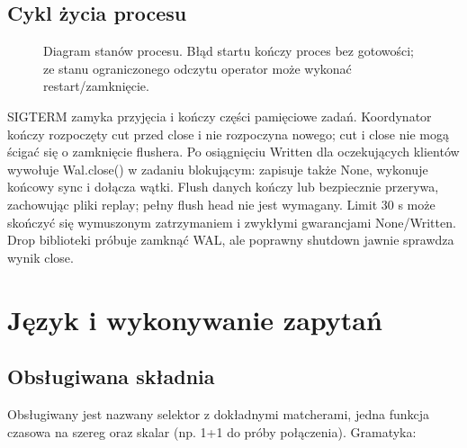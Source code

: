 \documentclass[11pt,a4paper]{article}
\begin{document}
\subsection{Cykl życia procesu}
\begin{figure}[htbp]
\centering
{}
\caption{Diagram stanów procesu. Błąd startu kończy proces bez gotowości;
ze stanu ograniczonego odczytu operator może wykonać restart/zamknięcie.}
\label{fig:lifecycle}
\end{figure}

SIGTERM zamyka przyjęcia i kończy części pamięciowe zadań.
Koordynator kończy rozpoczęty cut przed close i nie rozpoczyna nowego;
cut i close nie mogą ścigać się o zamknięcie flushera.
Po osiągnięciu Written dla oczekujących klientów wywołuje Wal.close()
w zadaniu blokującym: zapisuje także None, wykonuje końcowy sync
i dołącza wątki. Flush danych kończy lub bezpiecznie przerywa,
zachowując pliki replay; pełny flush head nie jest wymagany.
Limit 30 s może skończyć się wymuszonym zatrzymaniem i zwykłymi
gwarancjami None/Written. Drop biblioteki próbuje zamknąć WAL,
ale poprawny shutdown jawnie sprawdza wynik close.

\section{Język i wykonywanie zapytań}
\label{sec:language}

\subsection{Obsługiwana składnia}
Obsługiwany jest nazwany selektor z dokładnymi matcherami, jedna funkcja
czasowa na szereg oraz skalar (np. 1+1 do próby połączenia).
Gramatyka:
\end{document}
